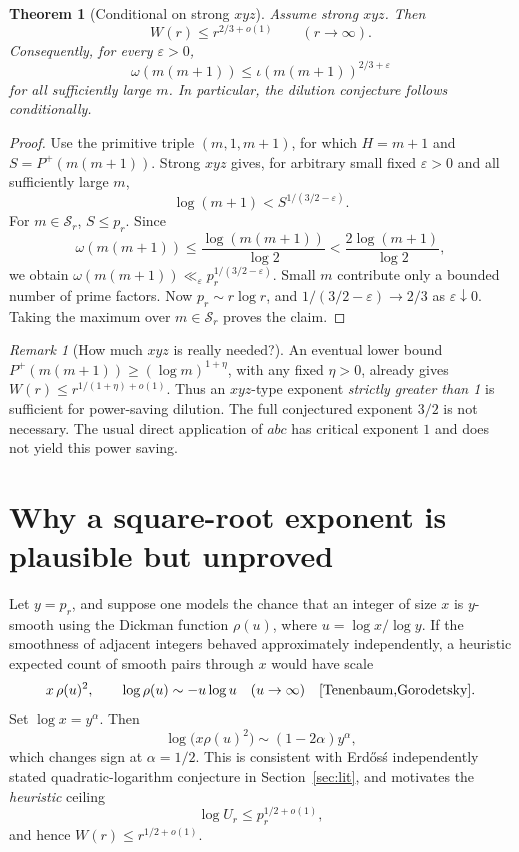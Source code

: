 \documentclass[11pt,letterpaper]{article}
\newtheorem{theorem}[conjecture]{Theorem}
\theoremstyle{remark}
\newtheorem{remark}[conjecture]{Remark}
\newcommand{\GPF}{P^{+}}
\newcommand{\iiota}{\iota}
\newcommand{\Om}{\omega}
\begin{document}
\begin{theorem}[Conditional on strong $xyz$]\label{thm:xyz}
Assume strong $xyz$. Then
\[
\boxed{W(r)\le r^{2/3+o(1)}}\qquad(r\to\infty).
\]
Consequently, for every $\varepsilon>0$,
\[
\Om(m(m+1))\le \iiota(m(m+1))^{2/3+\varepsilon}
\]
for all sufficiently large $m$. In particular, the dilution
conjecture follows conditionally.
\end{theorem}
\begin{proof}
Use the primitive triple $(m,1,m+1)$, for which $H=m+1$ and
$S=\GPF(m(m+1))$. Strong $xyz$ gives, for arbitrary small fixed
$\varepsilon>0$ and all sufficiently large $m$,
\[
\log(m+1)<S^{1/(3/2-\varepsilon)}.
\]
For $m\in\mathcal S_r$, $S\le p_r$. Since
\[
\Om(m(m+1))\le\frac{\log(m(m+1))}{\log2}
<\frac{2\log(m+1)}{\log2},
\]
we obtain $\Om(m(m+1))\ll_\varepsilon
p_r^{1/(3/2-\varepsilon)}$. Small $m$ contribute only a bounded
number of prime factors. Now $p_r\sim r\log r$, and
$1/(3/2-\varepsilon)\to2/3$ as $\varepsilon\downarrow0$.
Taking the maximum over $m\in\mathcal S_r$ proves the claim.
\end{proof}

\begin{remark}[How much $xyz$ is really needed?]
An eventual lower bound $\GPF(m(m+1))\ge(\log m)^{1+\eta}$,
with any fixed $\eta>0$, already gives
$W(r)\le r^{1/(1+\eta)+o(1)}$. Thus an $xyz$-type exponent
\emph{strictly greater than 1} is sufficient for power-saving
dilution. The full conjectured exponent $3/2$ is not necessary.
The usual direct application of $abc$ has critical exponent $1$
and does not yield this power saving.
\end{remark}

\section{Why a square-root exponent is plausible but unproved}
Let $y=p_r$, and suppose one models the chance that an integer of
size $x$ is $y$-smooth using the Dickman function $\rho(u)$, where
$u=\log x/\log y$. If the smoothness of adjacent integers behaved
approximately independently, a heuristic expected count of smooth
pairs through $x$ would have scale
\[
 x\,\rho(u)^2,\qquad \log\rho(u)\sim-u\log u
\quad(u\to\infty)\quad\text{\cite{Tenenbaum,Gorodetsky}}.
\]
Set $\log x=y^\alpha$. Then
\[
\log\bigl(x\rho(u)^2\bigr)
\sim(1-2\alpha)y^\alpha,
\]
which changes sign at $\alpha=1/2$.
This is consistent with Erd\H{o}s\'s independently stated quadratic-logarithm conjecture in Section~\ref{sec:lit}, and motivates the \emph{heuristic} ceiling
\[
 \log U_r\le p_r^{1/2+o(1)},
\]
and hence $W(r)\le r^{1/2+o(1)}$.
\end{document}
